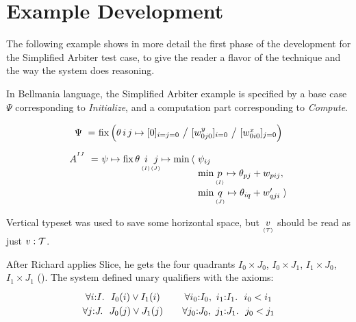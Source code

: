 \section{Example Development}

The following example shows in more detail the first phase of the development
for the Simplified Arbiter test case,
to give the reader a flavor of the technique and the way the system
does reasoning.

In Bellmania language, the Simplified Arbiter example is specified by
a base case $\Psi$ corresponding to {\it Initialize}, and a computation
part corresponding to {\it Compute}.

\begin{equation}
  \renewcommand\arraystretch{1.5}
  \begin{array}{@{}l@{}l@{}l@{}}
    \Psi ~=~ & \fix \Big(\theta\,i\,j\mapsto
	              [0]_{i=j=0} ~\big/~ [\yw{0j0}]_{i=0} ~\big/~ [\xw{0i0}]_{j=0}\Big)
  \end{array}
\end{equation}

\begin{equation}
  \renewcommand\arraystretch{1.2}
  \begin{array}{@{}l@{}l@{}c@{}c@{}l@{}l@{}}
    A^{^{IJ}} ~=~ 
	      & \psi\mapsto \fix \theta\,& i & j & \mapsto\min\,\langle~ & \psi_{ij} \\
	      & & ^{^{(I)}} & ^{^{(J)}} & & \min \vtyped p I \mapsto\theta_{pj}+w_{pij}, \\
	      & & & & & \min \vtyped q J \mapsto\theta_{iq}+w'_{qji} ~\rangle
  \end{array}
  \label{tactics:arbiter phase A}
\end{equation}

Vertical typeset was used to save some horizontal space, but $\underset{\scriptscriptstyle ( \mathcal{T} )}{ v }$
should be read as just $v:\mathcal{T}$.

\medskip

After Richard applies {\sf Slice}, he gets the four quadrants $I_0\times J_0$, $I_0\times J_1$, $I_1\times J_0$, $I_1\times J_1$
(). The system defined unary qualifiers with the axioms:
\[
\begin{array}{c@{\qquad}c}
  \forall i{:}I.~~I_0(i)\lor I_1(i)   &    \forall i_0{:}I_0,~i_1{:}I_1.~~i_0<i_1 \\
  \forall j{:}J.~~J_0(j)\lor J_1(j)   &    \forall j_0{:}J_0,~j_1{:}J_1.~~j_0<j_1 \\
\end{array}
\]

